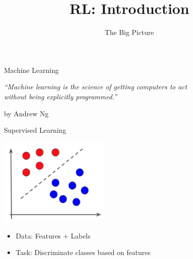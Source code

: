


\title[ML-RL: Big Picture]{RL: Introduction}
\subtitle{The Big Picture}




	
	\maketitle

\begin{frame}[c]{Machine Learning}

\centering
\textit{``Machine learning is the science of getting computers to act\\
 without being explicitly programmed.''}

\hfill by Andrew Ng

\end{frame}
\begin{frame}[c]{Supervised Learning}
	
\centering
\includegraphics[width=0.4\textwidth]{images/classification.png}

\bigskip

\begin{itemize}
	\item Data: Features + Labels
	\item Task: Discriminate classes based on features
\end{itemize}	

	
\end{frame}
